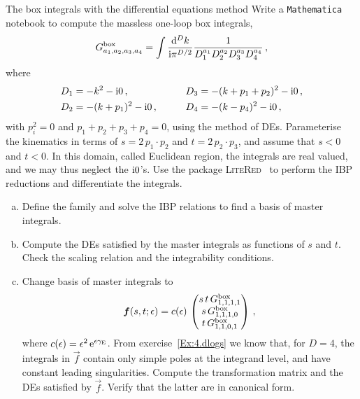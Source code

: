\begin{exer}{The box integrals with the differential equations method}
\label{Ex:4.BoxDE}
%
Write a \texttt{Mathematica} notebook to compute the massless one-loop box integrals,
\begin{align} \label{eq:box_def}
G^{\mathrm{box}}_{a_1,a_2,a_3,a_4} = \int \frac{\mathrm{d}^D k}{\mathrm{i} \pi^{D/2}} \frac{1}{D_1^{a_1} D_2^{a_2} D_3^{a_3} D_4^{a_4} }\,,
\end{align}
where
\begin{align}\begin{alignedat}{2}
& D_1 =  -k^2 - \mathrm{i} 0\,,  & \quad & D_3 =  -(k+p_1+p_2)^2 - \mathrm{i} 0 \,, \\
& D_2 = -(k+p_1)^2 - \mathrm{i} 0 \,, & \qquad \quad & D_4 = - (k-p_4)^2 - \mathrm{i} 0\,,
\end{alignedat}\end{align}
with $p_i^2=0$ and $p_1+p_2+p_3+p_4=0$, using the method of DEs.
Parameterise the kinematics in terms of $s = 2 \, p_1 \cdot p_2$ and $t = 2 \, p_2 \cdot p_3$, and assume that $s<0$ and $t<0$. In this domain, called Euclidean region, the integrals are real valued, and we may thus neglect the $\mathrm{i} 0$'s.
Use the package \textsc{LiteRed}~\cite{ch4Lee:2012cn} to perform the IBP reductions and differentiate the integrals. 
\begin{enumerate}[a)]
\item Define the family and solve the IBP relations to find a basis of master integrals. 
\item Compute the DEs satisfied by the master integrals as functions of $s$ and $t$. Check the scaling relation and the integrability conditions.
\item Change basis of master integrals to
\begin{align} \label{eq:fdef}
\vec{f}(s,t;\eps) = c(\eps) \, \begin{pmatrix}  
   s \, t \, G^{\text{box}}_{1,1,1,1} \\
   s \, G^{\text{box}}_{1,1,1,0} \\ 
   t \, G^{\text{box}}_{1,1,0,1}
\end{pmatrix} \,,
\end{align}
where $c(\epsilon) = \epsilon^2 \, \text{e}^{\epsilon \gamma_{\text{E}}}$. From exercise~\ref{Ex:4.dlogs} we know that, for $D=4$, the integrals in $\vec{f}$ contain only simple poles at the integrand level, and have constant leading singularities.
Compute the transformation matrix and the DEs satisfied by $\vec{f}$. Verify that the latter are in canonical form.


\end{enumerate}
\end{exer}
